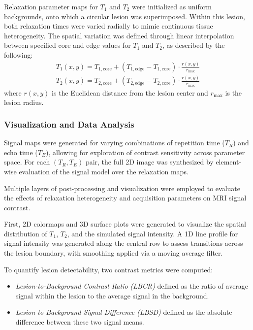 \documentclass[10pt,a4paper,twoside]{article}
\begin{document}
Relaxation parameter maps for \( T_1 \) and \( T_2 \) were initialized as uniform backgrounds, onto which a circular lesion was superimposed. Within this lesion, both relaxation times were varied radially to mimic continuous tissue heterogeneity. The spatial variation was defined through linear interpolation between specified core and edge values for \( T_1 \) and \( T_2 \), as described by the following:
\begin{align}
    T_1(x, y) = T_{1,\text{core}} + \left( T_{1,\text{edge}} - T_{1,\text{core}} \right) \cdot \frac{r(x, y)}{r_{\max}} \label{eq:relax1} \\
    T_2(x, y) = T_{2,\text{core}} + \left( T_{2,\text{edge}} - T_{2,\text{core}} \right) \cdot \frac{r(x, y)}{r_{\max}} \label{eq:relax2}
\end{align}
where \( r(x, y) \) is the Euclidean distance from the lesion center and \( r_{\max} \) is the lesion radius.

\subsubsection{Visualization and Data Analysis}

Signal maps were generated for varying combinations of repetition time (\( T_R \)) and echo time (\( T_E \)), allowing for exploration of contrast sensitivity across parameter space. For each \( (T_R, T_E) \) pair, the full 2D image was synthesized by element-wise evaluation of the signal model over the relaxation maps.

Multiple layers of post-processing and visualization were employed to evaluate the effects of relaxation heterogeneity and acquisition parameters on MRI signal contrast.

First, 2D colormaps and 3D surface plots were generated to visualize the spatial distribution of \( T_1 \), \( T_2 \), and the simulated signal intensity. A 1D line profile for signal intensity was generated along the central row to assess transitions across the lesion boundary, with smoothing applied via a moving average filter.

To quantify lesion detectability, two contrast metrics were computed:
\begin{itemize}
    \item \textit{Lesion-to-Background Contrast Ratio (LBCR)} defined as the ratio of average signal within the lesion to the average signal in the background.
    \item \textit{Lesion-to-Background Signal Difference (LBSD)} defined as the absolute difference between these two signal means.
\end{itemize}
\end{document}

